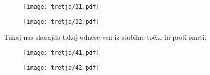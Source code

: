 \documentclass{article}
\begin{document}
\begin{figure}[H]
\centering
\begin{subfigure}{.49\textwidth}
\texttt{[image: tretja/31.pdf]}
\end{subfigure}
\begin{subfigure}{.49\textwidth}
\texttt{[image: tretja/32.pdf]}
\end{subfigure}
\caption*{Tukaj nas skorajda takoj odnese ven iz stabilne točke in proti smrti.}
\end{figure}

\begin{figure}[H]
\centering
\begin{subfigure}{.49\textwidth}
\texttt{[image: tretja/41.pdf]}
\end{subfigure}
\begin{subfigure}{.49\textwidth}
\texttt{[image: tretja/42.pdf]}
\end{subfigure}
\caption*{}
\end{figure}
\end{document}
